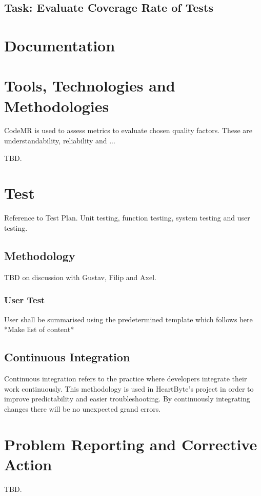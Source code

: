 \documentclass{article}
\begin{document}
	\subsection{Task: Evaluate Coverage Rate of Tests}
	
	\section{Documentation} \label{doc}
	
	\section{Tools, Technologies and Methodologies} %
	CodeMR is used to assess metrics to evaluate chosen quality factors. These are understandability, reliability and ...
	
	TBD.
	
	
	\section{Test}
	Reference to Test Plan. Unit testing, function testing, system testing and user testing. 
	
	\subsection{Methodology}
	TBD on discussion with Gustav, Filip and Axel.
	
	\subsubsection{User Test}
	User shall be summarised using the predetermined template which follows here *Make list of content*
		
	\subsection{Continuous Integration}
	Continuous integration refers to the practice where developers integrate their work continuously. This methodology is used in HeartByte's project in order to improve predictability and easier troubleshooting. By continuously integrating changes there will be no unexpected grand errors. 
	

	
	\section{Problem Reporting and Corrective Action}
	TBD.
	
	
\end{document}
